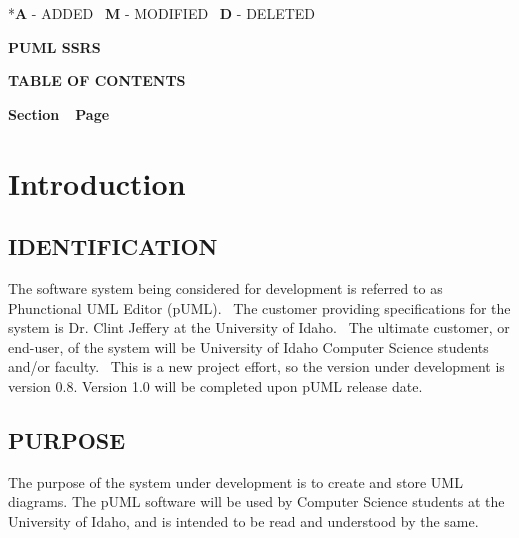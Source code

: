 \documentclass[twoside,letterpaper]{article}
\begin{document}
{
{*}{\textbf{A}}{
- ADDED
\ }{\textbf{M}}{ -
MODIFIED
\ }{\textbf{D}}{ -
DELETED}}

\clearpage
{\centering\bfseries {\MakeUppercase{pUML SSRS}}
\par}

{\centering\bfseries
TABLE OF CONTENTS
\par}


\bigskip

{\bfseries
Section\ \ Page}

\setcounter{tocdepth}{9}
\renewcommand\contentsname{}
\tableofcontents

\bigskip








\clearpage\clearpage\setcounter{page}{1}\pagestyle{Convertii}
\section[Introduction]{\rmfamily\bfseries
Introduction}

\subsection[IDENTIFICATION]{\rmfamily\bfseries
IDENTIFICATION}
{
The software system being considered for development is referred to as Phunctional UML Editor (pUML). \ The customer providing specifications
for the system is Dr. Clint Jeffery at the University of Idaho. \ The ultimate
customer, or end-user, of the system will be University of Idaho Computer Science students and/or faculty. \ This is a new project effort, so the version under development is version 0.8.
\newline Version 1.0 will be completed upon pUML release date.}

\subsection[PURPOSE]{\rmfamily\bfseries
PURPOSE}
{
The purpose of the system under development is to create and store UML diagrams.
\newline The pUML software will be used by Computer Science students at the University of Idaho, and is intended to be read and understood by the same.}
\end{document}
